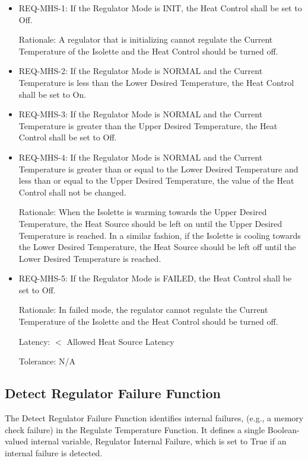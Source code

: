 \begin{itemize}
\item REQ-MHS-1: If the Regulator Mode is INIT, the Heat Control shall be set to Off.

      Rationale: A regulator that is initializing cannot regulate the Current Temperature of the
      Isolette and the Heat Control should be turned off.
\item REQ-MHS-2: If the Regulator Mode is NORMAL and the Current Temperature is less
      than the Lower Desired Temperature, the Heat Control shall be set to On.
\item REQ-MHS-3: If the Regulator Mode is NORMAL and the Current Temperature is
      greater than the Upper Desired Temperature, the Heat Control shall be set to Off.
\item REQ-MHS-4: If the Regulator Mode is NORMAL and the Current Temperature is
      greater than or equal to the Lower Desired Temperature and less than or equal to the
      Upper Desired Temperature, the value of the Heat Control shall not be changed.

      Rationale: When the Isolette is warming towards the Upper Desired Temperature, the
      Heat Source should be left on until the Upper Desired Temperature is reached. In a
      similar fashion, if the Isolette is cooling towards the Lower Desired Temperature, the
      Heat Source should be left off until the Lower Desired Temperature is reached.
\item REQ-MHS-5: If the Regulator Mode is FAILED, the Heat Control shall be set to Off.

      Rationale: In failed mode, the regulator cannot regulate the Current Temperature of the
      Isolette and the Heat Control should be turned off.

      Latency: $<$ Allowed Heat Source Latency

      Tolerance: N/A
\end{itemize}

\subsection{Detect Regulator Failure Function}
\label{subsec:detect-regulator-failure}

The Detect Regulator Failure Function identifies internal failures, (e.g., a memory check failure)
in the Regulate Temperature Function. It defines a single Boolean-valued internal variable,
Regulator Internal Failure, which is set to True if an internal failure is detected.


